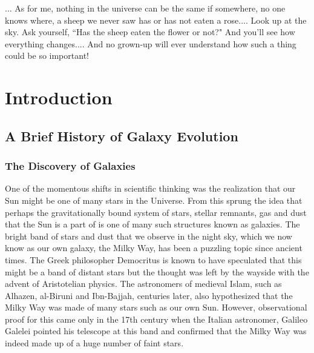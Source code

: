 \begin{savequote}[75mm]

... As for me, nothing in the universe can be the same if somewhere, no one knows where, a sheep we never saw has or has not eaten a rose....
Look up at the sky. Ask yourself, ``Has the sheep eaten the flower or not?" And you'll see how everything changes....
And no grown-up will ever understand how such a thing could be so important!
\end{savequote}


\chapter{Introduction}
\label{introduction}

\section{A Brief History of Galaxy Evolution}

\subsection{The Discovery of Galaxies}
One of the momentous shifts in scientific thinking was the realization that our Sun might be one of many stars in the Universe. From this sprung the idea that perhaps the gravitationally bound system of stars, stellar remnants, gas and dust that the Sun is a part of is one of many such structures known as galaxies. The bright band of stars and dust that we observe in the night sky, which we now know as our own galaxy, the Milky Way, has been a puzzling topic since ancient times. The Greek philosopher Democritus is known to have speculated that this might be a band of distant stars \citep{lynn_letter} but the thought was left by the wayside with the advent of Aristotelian physics. The astronomers of medieval Islam, such as Alhazen, al-Biruni and Ibn-Bajjah, centuries later, also hypothesized that the Milky Way was made of many stars such as our own Sun. However, observational proof for this came only in the 17th century when the Italian astronomer, Galileo Galelei pointed his telescope at this band and confirmed that the Milky Way was indeed made up of a huge number of faint stars.\\

